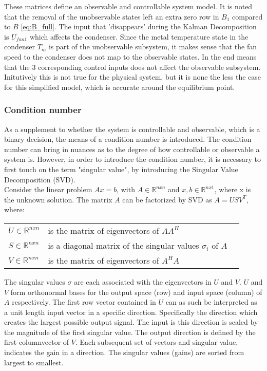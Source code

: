 These matrices define an observable and controllable system model. It is noted that the removal of the unobservable states left an extra zero row in $B_1$ compared to $ B $ \cref{eq:B_full}. The input that 'disappears' during the Kalman Decomposition is $ U_{fan1} $ which affects the condenser. Since the metal temperature state in the condenser $ T_m $ is part of the unobservable subsystem, it makes sense that the fan speed to the condenser does not map to the observable states.
In the end means that the 3 corresponding control inputs does not affect the observable subsystem. Initutively this is not true for the physical system, but it is none the less the case for this simplified model, which is accurate around the equilibrium point.

\subsubsection{Condition number} \label{sec:condNumber}
As a supplement to whether the system is controllable and observable, which is a binary decision, the means of a condition number is introduced. The condition number can bring in nuances as to the degree of how controllable or observable a system is. However, in order to introduce the condition number, it is necessary to first touch on the term "singular value", by introducing the Singular Value Decomposition (SVD).\\

Consider the linear problem $Ax=b$, with $A \in \mathbb{R} ^{n x n}$ and $ x, b \in \mathbb{R} ^{n x 1}$, where x is the unknown solution. The matrix $A$ can be factorized by SVD as $A = USV^T$, where:
\begin{center}
	\begin{tabular}{l p{8cm} l}
		$U \in \mathbb{R} ^{n x n}$		& is the matrix of eigenvectors of $AA^H$  &  \\
		$S \in \mathbb{R} ^{n x n}$ 	& is a diagonal matrix of the singular values $\sigma_i$ of $A$ &  \\
		$V \in \mathbb{R} ^{n x n}$		& is the matrix of eigenvectors of $A^HA$  &  \\
	\end{tabular}
\end{center}

The singular values $\sigma$ are each associated with the eigenvectors in $U$ and $V$. $U$ and $V$ form orthonormal bases for the output space (row) and input space (column) of $A$ respectively. The first row vector contained in $U$ can as such be interpreted as a unit length input vector in a specific direction. Specifically the direction which creates the largest possible output signal. The input is this direction is scaled by the magnitude of the first singular value. The output direction is defined by the first columnvector of $V$. Each subsequent set of vectors and singular value, indicates the gain in a direction. The singular values (gains) are sorted from largest to smallest.

